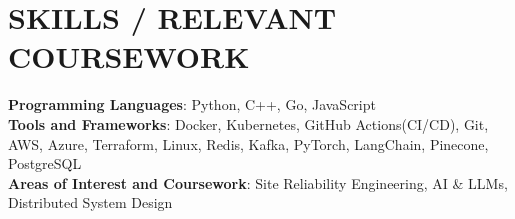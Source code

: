 \documentclass[letterpaper,11pt]{article}
\newcommand{\SectionListBegin}{\begin{itemize}[leftmargin=0.15in, label={}]}
\newcommand{\SectionListEnd}{\end{itemize}}
\newcommand{\swallow}[1]{}
\begin{document}
\section{SKILLS / RELEVANT COURSEWORK}
  \SectionListBegin
    \small{\item{
    \vspace{1mm}
     \textbf{Programming Languages}{: Python, C++, Go, JavaScript} \\
     \vspace{1mm}
     \textbf{Tools and Frameworks}{: Docker, Kubernetes, GitHub Actions(CI/CD), Git, AWS, Azure, Terraform, Linux, Redis, Kafka, PyTorch, LangChain, Pinecone, PostgreSQL \swallow{ Prometheus, Grafana, REST(FastAPI, Next.js),}}\\
     \vspace{1mm}
     \textbf{Areas of Interest and Coursework}{: Site Reliability Engineering, AI \& LLMs, Distributed System Design \swallow{Data Structures \& Algorithms, Software Engineering (SDLC), Distributed System Design, Object Oriented Design (OOD), Computer Architecture} } \\
     \vspace{1mm}
    }}
  \SectionListEnd

\end{document}

